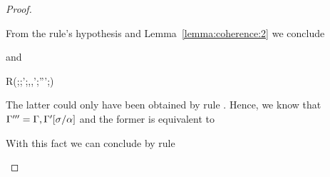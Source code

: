 \begin{proof}
\begin{description}
From the rule's hypothesis and Lemma~\ref{lemma:coherence:2} we conclude
\begin{myequation*}
\end{myequation*}
  and
\begin{myequation*}
  R(\tenv;\alpha;\tenv';\tenv,\alpha,\tenv';\tenv''';\suty)
\end{myequation*}
  The latter could only have been obtained by rule . 
  Hence, we know that $\Gamma''' = \Gamma,\Gamma'[\sigma/\alpha]$ and the former is equivalent to
\begin{myequation*}
\end{myequation*}
With this fact we can conclude by rule 
\begin{myequation*}
\end{myequation*}
\end{description}
\end{proof}

{\centering
{}}

